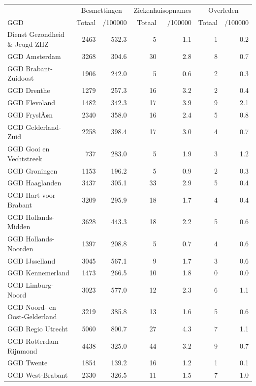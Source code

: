 \documentclass[
  english,
  man,floatsintext]{apa6}
\begin{document}
\begin{table}
\centering\begingroup\fontsize{10}{12}\selectfont

\begin{threeparttable}
\begin{tabular}{lrrrrrr}
\toprule
\multicolumn{1}{c}{ } & \multicolumn{2}{c}{Besmettingen} & \multicolumn{2}{c}{Ziekenhuisopnames} & \multicolumn{2}{c}{Overleden} \\
\cmidrule(l{3pt}r{3pt}){2-3} \cmidrule(l{3pt}r{3pt}){4-5} \cmidrule(l{3pt}r{3pt}){6-7}
GGD & Totaal & /100000 & Totaal & /100000 & Totaal & /100000\\
\midrule
Dienst Gezondheid \& Jeugd ZHZ & 2463 & 532.3 & 5 & 1.1 & 1 & 0.2\\
GGD Amsterdam & 3268 & 304.6 & 30 & 2.8 & 8 & 0.7\\
GGD Brabant-Zuidoost & 1906 & 242.0 & 5 & 0.6 & 2 & 0.3\\
GGD Drenthe & 1279 & 257.3 & 16 & 3.2 & 2 & 0.4\\
GGD Flevoland & 1482 & 342.3 & 17 & 3.9 & 9 & 2.1\\
GGD FryslÃ¢n & 2340 & 358.0 & 16 & 2.4 & 5 & 0.8\\
GGD Gelderland-Zuid & 2258 & 398.4 & 17 & 3.0 & 4 & 0.7\\
GGD Gooi en Vechtstreek & 737 & 283.0 & 5 & 1.9 & 3 & 1.2\\
GGD Groningen & 1153 & 196.2 & 5 & 0.9 & 2 & 0.3\\
GGD Haaglanden & 3437 & 305.1 & 33 & 2.9 & 5 & 0.4\\
GGD Hart voor Brabant & 3209 & 295.9 & 18 & 1.7 & 4 & 0.4\\
GGD Hollands-Midden & 3628 & 443.3 & 18 & 2.2 & 5 & 0.6\\
GGD Hollands-Noorden & 1397 & 208.8 & 5 & 0.7 & 4 & 0.6\\
GGD IJsselland & 3045 & 567.1 & 9 & 1.7 & 3 & 0.6\\
GGD Kennemerland & 1473 & 266.5 & 10 & 1.8 & 0 & 0.0\\
GGD Limburg-Noord & 3023 & 577.0 & 12 & 2.3 & 6 & 1.1\\
GGD Noord- en Oost-Gelderland & 3219 & 385.8 & 13 & 1.6 & 5 & 0.6\\
GGD Regio Utrecht & 5060 & 800.7 & 27 & 4.3 & 7 & 1.1\\
GGD Rotterdam-Rijnmond & 4438 & 325.0 & 44 & 3.2 & 9 & 0.7\\
GGD Twente & 1854 & 139.2 & 16 & 1.2 & 1 & 0.1\\
GGD West-Brabant & 2330 & 326.5 & 11 & 1.5 & 7 & 1.0\\

\end{tabular}
\end{threeparttable}
\end{table}
\end{document}
